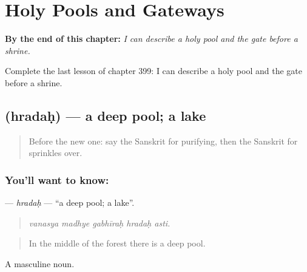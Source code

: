 
\chapter{Holy Pools and Gateways}
\label{ch:sa-holy-pools-and-gateways}

\begin{chapteropening}
\textbf{By the end of this chapter:} \emph{I can describe a holy pool and the gate before a shrine.}

Complete the last lesson of chapter 399: I can describe a holy pool and the gate before a shrine.
\end{chapteropening}

\section[\texorpdfstring{\sk{ह्रदः} (hradaḥ)}{ह्रदः (hradaḥ)}]{ (hradaḥ) — a deep pool; a lake}

\label{lesson:SA-C399-hradah}



\begin{quote}
Before the new one: say the Sanskrit for purifying, then the Sanskrit for sprinkles over.
\end{quote}

\subsection*{You'll want to know: }
\textbf{} — \emph{hradaḥ} — \textquotedblleft{}a deep pool; a lake\textquotedblright{}.

\begin{quote}
    
\end{quote}

\begin{quote}
\emph{vanasya madhye gabhīraḥ hradaḥ asti.}
\end{quote}

\begin{quote}
In the middle of the forest there is a deep pool.
\end{quote}

A masculine noun.

